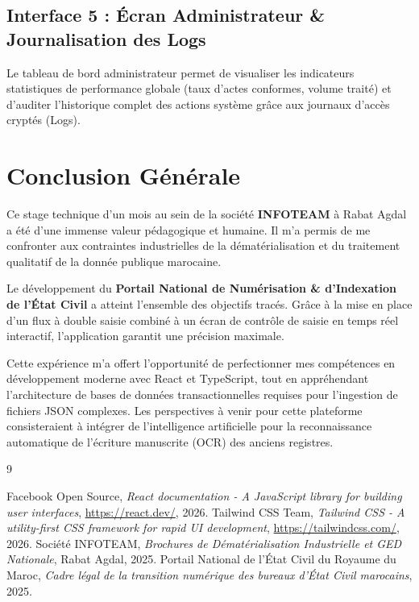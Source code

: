 \documentclass[12pt,a4paper,oneside]{report}
\begin{document}
\section{Interface 5 : Écran Administrateur \& Journalisation des Logs}
Le tableau de bord administrateur permet de visualiser les indicateurs statistiques de performance globale (taux d'actes conformes, volume traité) et d'auditer l'historique complet des actions système grâce aux journaux d'accès cryptés (Logs).

\chapter*{Conclusion Générale}
Ce stage technique d'un mois au sein de la société \textbf{INFOTEAM} à Rabat Agdal a été d'une immense valeur pédagogique et humaine. Il m'a permis de me confronter aux contraintes industrielles de la dématérialisation et du traitement qualitatif de la donnée publique marocaine.

Le développement du \textbf{Portail National de Numérisation \& d'Indexation de l'État Civil} a atteint l'ensemble des objectifs tracés. Grâce à la mise en place d'un flux à double saisie combiné à un écran de contrôle de saisie en temps réel interactif, l'application garantit une précision maximale. 

Cette expérience m'a offert l'opportunité de perfectionner mes compétences en développement moderne avec React et TypeScript, tout en appréhendant l'architecture de bases de données transactionnelles requises pour l'ingestion de fichiers JSON complexes. Les perspectives à venir pour cette plateforme consisteraient à intégrer de l'intelligence artificielle pour la reconnaissance automatique de l'écriture manuscrite (OCR) des anciens registres.

\newpage
\begin{thebibliography}{9}
  Facebook Open Source,
  \textit{React documentation - A JavaScript library for building user interfaces},
  \url{https://react.dev/}, 2026.
  Tailwind CSS Team,
  \textit{Tailwind CSS - A utility-first CSS framework for rapid UI development},
  \url{https://tailwindcss.com/}, 2026.
  Société INFOTEAM,
  \textit{Brochures de Dématérialisation Industrielle et GED Nationale}, Rabat Agdal, 2025.
  Portail National de l'État Civil du Royaume du Maroc,
  \textit{Cadre légal de la transition numérique des bureaux d'État Civil marocains}, 2025.
\end{thebibliography}
\end{document}
